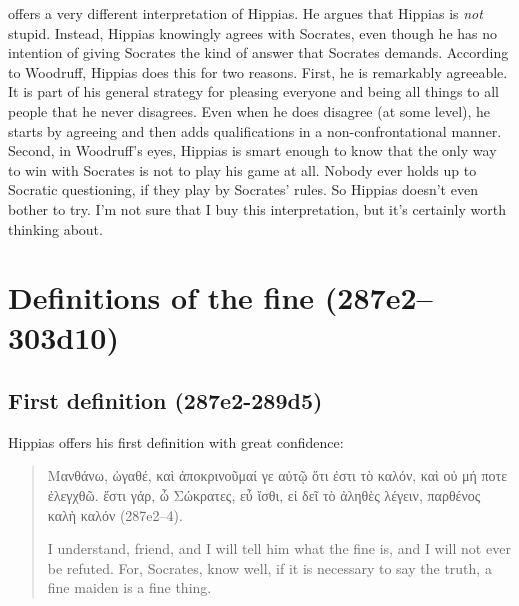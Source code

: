 \documentclass[11pt]{article}
\begin{document}
\citet{woodruff1982} offers a very different interpretation of Hippias.  He
argues that Hippias is \emph{not} stupid.  Instead, Hippias knowingly agrees
with Socrates, even though he has no intention of giving Socrates the kind of
answer that Socrates demands.  According to Woodruff, Hippias does this for two
reasons.  First, he is remarkably agreeable.  It is part of his general
strategy for pleasing everyone and being all things to all people that he never
disagrees.  Even when he does disagree (at some level), he starts by agreeing
and then adds qualifications in a non-confrontational manner.  Second, in
Woodruff's eyes, Hippias is smart enough to know that the only way to win with
Socrates is not to play his game at all.  Nobody ever holds up to Socratic
questioning, if they play by Socrates' rules.  So Hippias doesn't even bother
to try.  I'm not sure that I buy this interpretation, but it's certainly worth
thinking about.


\section{Definitions of the fine (287e2--303d10)}

\subsection{First definition (287e2-289d5)}

Hippias offers his first definition with great confidence:

\begin{quote}

    {\g Μανθάνω, ὠγαθέ, καὶ ἀποκρινοῦμαί γε αὐτῷ ὅτι ἐστι τὸ καλόν, καὶ οὐ μή
    ποτε ἐλεγχθῶ. ἔστι γάρ, ὦ Σώκρατες, εὖ ἴσθι, εἰ δεῖ τὸ ἀληθὲς λέγειν,
    παρθένος καλὴ καλόν} (287e2--4).

    I understand, friend, and I will tell him what the fine is, and I will not
    ever be refuted.  For, Socrates, know well, if it is necessary to say the
    truth, a fine maiden is a fine thing.

\end{quote}
\end{document}

